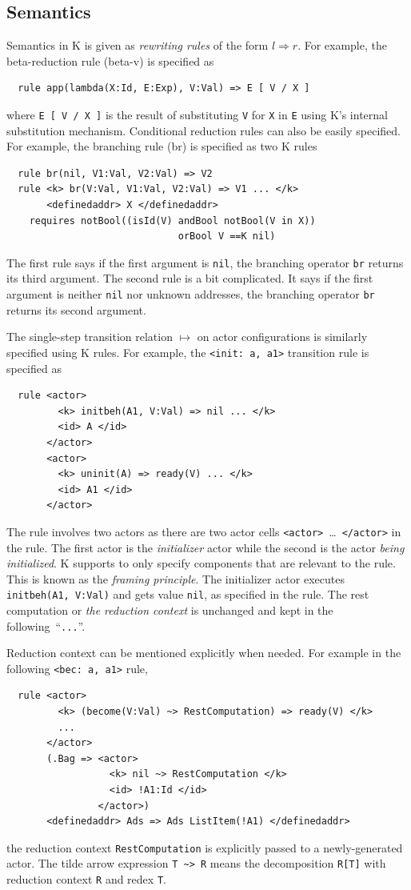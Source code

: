 \documentclass{llncs}
\begin{document}
\subsection{Semantics}\label{sec:semantics}
Semantics in K is given as \emph{rewriting rules} of the form $l \Rightarrow r$.
For example, the  beta-reduction rule (beta-v) is specified as
\begin{verbatim}
  rule app(lambda(X:Id, E:Exp), V:Val) => E [ V / X ]
\end{verbatim}
where \texttt{E [ V / X ]} is the result of substituting \texttt{V} for 
\texttt{X} in \texttt{E} using K's internal substitution mechanism.
Conditional reduction rules can also be easily specified.
For example, the branching rule (br) is specified as two K rules
\begin{verbatim}
  rule br(nil, V1:Val, V2:Val) => V2
  rule <k> br(V:Val, V1:Val, V2:Val) => V1 ... </k>
       <definedaddr> X </definedaddr>
    requires notBool((isId(V) andBool notBool(V in X))
                              orBool V ==K nil)
\end{verbatim}
The first rule says if the first argument is \texttt{nil}, the branching 
operator \texttt{br} returns its third argument.
The second rule is a bit complicated.
It says if the first argument is neither \texttt{nil} nor 
unknown addresses, the branching operator \texttt{br} returns its second 
argument.

The single-step transition relation $\mapsto$ on actor configurations is 
similarly specified using K rules.
For example, the \texttt{<init: a, a1>} transition rule is specified as
\begin{verbatim}
  rule <actor>
         <k> initbeh(A1, V:Val) => nil ... </k>
         <id> A </id>
       </actor>
       <actor>
         <k> uninit(A) => ready(V) ... </k>
         <id> A1 </id>
       </actor>
\end{verbatim}
The rule involves two actors as there are two actor cells 
\texttt{<actor>}\ \dots\ \texttt{</actor>} in the rule.
The first actor is the \emph{initializer} actor while the second is the actor 
\emph{being initialized}.
K supports to only specify components that are relevant to the rule. This is 
known as the \emph{framing principle}.
The initializer actor executes \texttt{initbeh(A1, V:Val)} and gets value 
\texttt{nil}, as specified in the rule.
The rest computation or \emph{the reduction context} is unchanged and kept in 
the following~``\texttt{...}''.

Reduction context can be mentioned explicitly when needed.
For example in the following \texttt{<bec: a, a1>} rule,
\begin{verbatim}
  rule <actor>
         <k> (become(V:Val) ~> RestComputation) => ready(V) </k>
         ...
       </actor>
       (.Bag => <actor>
                  <k> nil ~> RestComputation </k>
                  <id> !A1:Id </id>
                </actor>)
       <definedaddr> Ads => Ads ListItem(!A1) </definedaddr>
\end{verbatim}
the reduction context \texttt{RestComputation} is explicitly passed to a 
newly-generated actor.
The tilde arrow expression \verb|T ~> R| 
means the decomposition \verb|R[T]| with reduction context \texttt{R} and redex 
\texttt{T}.
\end{document}
